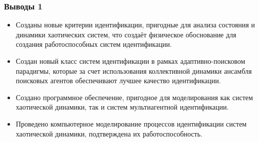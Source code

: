\documentclass[10pt,utf8]{beamer}
\begin{document}

\begin{frame}
  \frametitle{Выводы 1}

  \begin{itemize}

    \item
      Созданы новые критерии идентификации,
      пригодные для анализа состояния и динамики хаотических систем, что создаёт
      физическое  обоснование для создания работоспособных систем идентификации.

    \item
      Создан новый класс систем идентификации в рамках адаптивно-поисковом парадигмы,
      которые за счет использования коллективной динамики ансамбля поисковых
      агентов обеспечивают лучшее качество идентификации.

    \item
      Создано программное обеспечение, пригодное для моделирования как систем
      хаотической динамики, так и систем мультиагентной идентификации.

    \item
      Проведено компьютерное моделирование процессов идентификации систем хаотической
      динамики, подтверждена их работоспособность.

  \end{itemize}


\end{frame}



%
%
%
\end{document}
